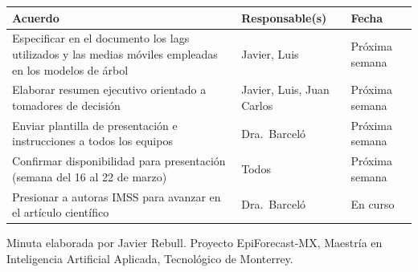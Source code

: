 \documentclass[11pt,letterpaper]{article}
\begin{document}
\noindent
\begin{tabular}{@{}p{}p{}p{}@{}}
    \toprule
    \textbf{Acuerdo} & \textbf{Responsable(s)} & \textbf{Fecha} \\
    \midrule
    Especificar en el documento los lags utilizados y las medias móviles empleadas en los modelos de árbol &
    Javier, Luis &
    Próxima semana \\
    \addlinespace
    Elaborar resumen ejecutivo orientado a tomadores de decisión &
    Javier, Luis, Juan Carlos &
    Próxima semana \\
    \addlinespace
    Enviar plantilla de presentación e instrucciones a todos los equipos &
    Dra.\ Barceló &
    Próxima semana \\
    \addlinespace
    Confirmar disponibilidad para presentación (semana del 16 al 22 de marzo) &
    Todos &
    Próxima semana \\
    \addlinespace
    Presionar a autoras IMSS para avanzar en el artículo científico &
    Dra.\ Barceló &
    En curso \\
    \bottomrule
\end{tabular}

\vspace{2em}

\noindent\textcolor{coolgray}{\small Minuta elaborada por Javier Rebull. Proyecto EpiForecast-MX, Maestría en Inteligencia Artificial Aplicada, Tecnológico de Monterrey.}
\end{document}
